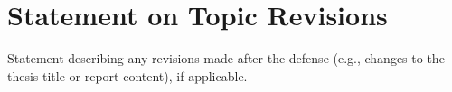 \chapter*{Statement on Topic Revisions}
\label{edit}

Statement describing any revisions made after the defense (e.g., changes to the thesis title or report content), if applicable.

